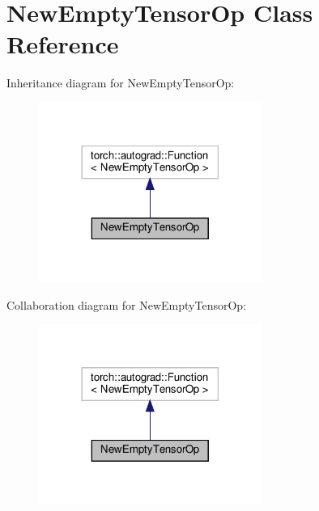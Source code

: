 \hypertarget{classNewEmptyTensorOp}{}\section{New\+Empty\+Tensor\+Op Class Reference}
\label{classNewEmptyTensorOp}


Inheritance diagram for New\+Empty\+Tensor\+Op\+:
\nopagebreak
\begin{figure}[H]
\begin{center}
\leavevmode
\includegraphics[width=206pt]{classNewEmptyTensorOp__inherit__graph}
\end{center}
\end{figure}


Collaboration diagram for New\+Empty\+Tensor\+Op\+:
\nopagebreak
\begin{figure}[H]
\begin{center}
\leavevmode
\includegraphics[width=206pt]{classNewEmptyTensorOp__coll__graph}
\end{center}
\end{figure}
